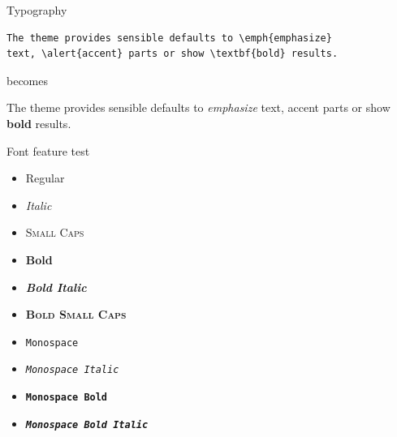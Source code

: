 \documentclass[aspectratio=169,10pt]{beamer}
\begin{document}
\begin{frame}[fragile]{Typography}
\begin{verbatim}The theme provides sensible defaults to \emph{emphasize}
text, \alert{accent} parts or show \textbf{bold} results.\end{verbatim}

\begin{center}becomes\end{center}

The theme provides sensible defaults to \emph{emphasize} text,
\alert{accent} parts or show \textbf{bold} results.
\end{frame}

\begin{frame}{Font feature test}
  \begin{itemize}
    \item Regular
    \item \textit{Italic}
    \item \textsc{Small Caps}
    \item \textbf{Bold}
    \item \textbf{\textit{Bold Italic}}
    \item \textbf{\textsc{Bold Small Caps}}
    \item \texttt{Monospace}
    \item \texttt{\textit{Monospace Italic}}
    \item \texttt{\textbf{Monospace Bold}}
    \item \texttt{\textbf{\textit{Monospace Bold Italic}}}
  \end{itemize}
\end{frame}
\end{document}
